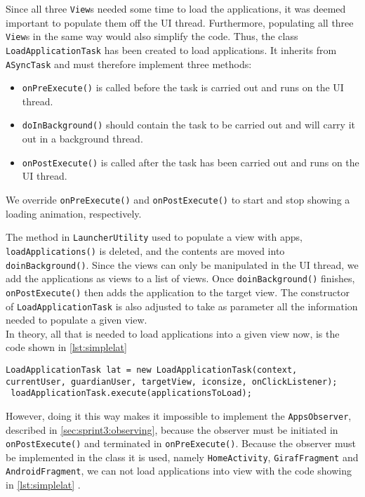 Since all three \lstinline!View!s needed some time to load the applications, it was deemed important to populate them off the UI thread.
Furthermore, populating all three \lstinline!View!s in the same way would also simplify the code.
Thus, the class \lstinline!LoadApplicationTask! has been created to load applications. 
It inherits from \lstinline!ASyncTask! and must therefore implement three methods:

\begin{itemize}
\item \lstinline!onPreExecute()! is called before the task is carried out and runs on the UI thread.
\item \lstinline!doInBackground()! should contain the task to be carried out and will carry it out in a background thread.
\item \lstinline!onPostExecute()! is called after the task has been carried out and runs on the UI thread.
\end{itemize}

We override \lstinline!onPreExecute()! and \lstinline!onPostExecute()! to start and stop showing a loading animation, respectively.

The method in \lstinline!LauncherUtility! used to populate a view with apps, \lstinline!loadApplications()! is deleted, and the contents are moved into \lstinline!doinBackground()!.
Since the views can only be manipulated in the UI thread, we add the applications as views to a list of views.
Once \lstinline!doinBackground()! finishes, \lstinline!onPostExecute()! then adds the application to the target view. 
 The constructor of \lstinline!LoadApplicationTask! is also adjusted to take as parameter all the information needed to populate a given view.\\
 
 In theory, all that is needed to load applications into a given view now, is the code shown in \cref{lst:simplelat} 
 
 \begin{lstlisting}[caption={The simple way of implementing LoadApplicationTask.}, label={lst:simplelat}]
 LoadApplicationTask lat = new LoadApplicationTask(context, currentUser, guardianUser, targetView, iconsize, onClickListener);
 loadApplicationTask.execute(applicationsToLoad);
 \end{lstlisting}
 
 However, doing it this way makes it impossible to implement the \lstinline!AppsObserver!, described in \cref{sec:sprint3:observing}, because the observer must be initiated in \lstinline!onPostExecute()! and terminated in \lstinline!onPreExecute()!.
 Because the observer must be implemented in the class it is used, namely \lstinline!HomeActivity!, \lstinline!GirafFragment! and \lstinline!AndroidFragment!, we can not  load applications into view with the code showing in \cref{lst:simplelat} .\\
 
